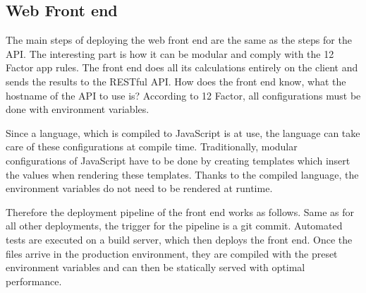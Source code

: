 \subsection{Web Front end}

The main steps of deploying the web front end are the same as the steps for the
API. The interesting part is how it can be modular and comply with the 12
Factor app rules. The front end does all its calculations entirely on the client
and sends the results to the RESTful API. How does the front end know, what the
hostname of the API to use is? According to 12 Factor, all configurations must
be done with environment variables.

Since a language, which is compiled to JavaScript is at use, the language can
take care of these configurations at compile time. Traditionally, modular
configurations of JavaScript have to be done by creating templates which insert
the values when rendering these templates. Thanks to the compiled language, the
environment variables do not need to be rendered at runtime.

Therefore the deployment pipeline of the front end works as follows. Same as for
all other deployments, the trigger for the pipeline is a git commit. Automated
tests are executed on a build server, which then deploys the front end. Once the
files arrive in the production environment, they are compiled with the preset
environment variables and can then be statically served with optimal
performance.
